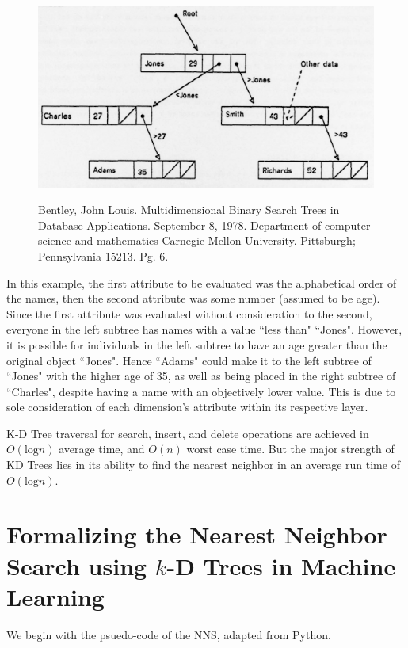 \documentclass{article}
\begin{document}
\begin{figure}[h]
    \centering
    \includegraphics[width=\textwidth,keepaspectratio]{Images/kd_tree.png}
    \label{fig:kd_tree}
    \caption{Bentley, John Louis. Multidimensional Binary Search Trees in Database Applications. September 8, 1978. Department of computer science and mathematics Carnegie-Mellon University. Pittsburgh; Pennsylvania 15213. Pg. 6.}
\end{figure}


In this example, the first attribute to be evaluated was the alphabetical order of the names, then the second attribute was some number (assumed to be age). Since the first attribute was evaluated without consideration to the second, everyone in the left subtree has names with a value ``less than" ``Jones". However, it is possible for individuals in the left subtree to have an age greater than the original object ``Jones". Hence ``Adams" could make it to the left subtree of ``Jones" with the higher age of 35, as well as being placed in the right subtree of ``Charles", despite having a name with an objectively lower value. This is due to sole consideration of each dimension’s attribute within its respective layer.

K-D Tree traversal for search, insert, and delete operations are achieved in $O(\text{log} n)$ average time, and $O(n)$ worst case time. But the major strength of KD Trees lies in its ability to find the nearest neighbor in an average run time of $O(\text{log} n)$.


        \section*{Formalizing the Nearest Neighbor Search using $k$-D Trees in Machine Learning}

            We begin with the psuedo-code of the NNS, adapted from Python\cite{CMUSlides}.
\end{document}
